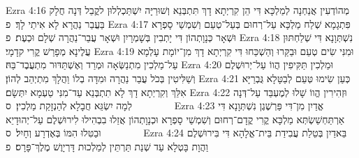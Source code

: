 Ezra 4:16	מְהוֹדְעִין אֲנַחְנָה לְמַלְכָּא דִּי הֵן קִרְיְתָא דָךְ תִּתְבְּנֵא וְשׁוּרַיָּה יִשְׁתַּכְלְלוּן לקֳבֵל דְּנָה חֲלָק בַּעֲבַר נַהֲרָא לָא אִיתַי לָךְ׃ {פ}
Ezra 4:17	פִּתְגָמָא שְׁלַח מַלְכָּא עַל־רְחוּם בְּעֵל־טְעֵם וְשִׁמְשַׁי סָפְרָא וּשְׁאָר כְּנָוָתְהוֹן דִּי יָתְבִין בְּשָׁמְרָיִן וּשְׁאָר עֲבַר־נַהֲרָה שְׁלָם וּכְעֶת׃ {פ}
Ezra 4:18	נִשְׁתְּוָנָא דִּי שְׁלַחְתּוּן עֲלֶינָא מְפָרַשׁ קֱרִי קדָמָי׃
Ezra 4:19	וּמִנִּי שִׂים טְעֵם וּבַקַּרוּ וְהַשְׁכַּחוּ דִּי קִרְיְתָא דָךְ מִן־יוֹמָת עָלְמָא עַל־מַלְכִין מִתְנַשְּׂאָה וּמְרַד וְאֶשְׁתַּדּוּר מִתְעֲבֶד־בַּהּ׃
Ezra 4:20	וּמַלְכִין תַּקִּיפִין הֲווֹ עַל־יְרוּשְׁלֶם וְשַׁלִּיטִין בְּכֹל עֲבַר נַהֲרָה וּמִדָּה בְלוֹ וַהֲלָךְ מִתְיְהֵב לְהוֹן׃
Ezra 4:21	כְּעַן שִׂימוּ טְּעֵם לְבַטָּלָא גֻּבְרַיָּא אִלֵּךְ וְקִרְיְתָא דָךְ לָא תִתְבְּנֵא עַד־מִנִּי טַעְמָא יִתְּשָׂם׃
Ezra 4:22	וּזְהִירִין הֱווֹ שָׁלוּ לְמֶעְבַּד עַל־דְּנָה לְמָה יִשְׂגֵּא חֲבָלָא לְהַנְזָקַת מַלְכִין׃ {ס}        
Ezra 4:23	אֱדַיִן מִן־דִּי פַּרְשֶׁגֶן נִשְׁתְּוָנָא דִּי אַרְתַּחְשַׁשְׂתְּא מַלְכָּא קֱרִי קֳדָם־רְחוּם וְשִׁמְשַׁי סָפְרָא וּכְנָוָתְהוֹן אֲזַלוּ בִבְהִילוּ לִירוּשְׁלֶם עַל־יְהוּדָיֵא וּבַטִּלוּ הִמּוֹ בְּאֶדְרָע וְחָיִל׃ {ס}        
Ezra 4:24	בֵּאדַיִן בְּטֵלַת עֲבִידַת בֵּית־אֱלָהָא דִּי בִּירוּשְׁלֶם וַהֲוָת בָּטְלָא עַד שְׁנַת תַּרְתֵּין לְמַלְכוּת דָּרְיָוֶשׁ מֶלֶךְ־פָּרָס׃ {פ}
